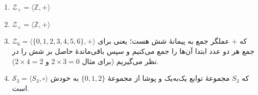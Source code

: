 \begin{enumerate}[\label=(\alph)]
    \item $\mathcal{Z_+}=\langle\mathbb{Z},+\rangle$
    \item $\mathcal{Z_\times}=\langle\mathbb{Z},+\rangle$
    \item $\mathcal{Z_6}=\langle\{0,1,2,3,4,5,6\},+\rangle$
    که $+$ عملگر جمع به پیمانهٔ شش هست؛ یعنی برای جمع هر دو عدد ابتدا آن‌ها را جمع می‌کنیم و سپس باقی‌ماندهٔ حاصل بر شش را در نظر می‌گیریم
    (برای مثال
    $2\times 3=0$
    و
    $2\times 4=2$).
    \item $\mathcal{S_3}=\langle S_3, \circ\rangle$
    که
    $S_3$
    مجموعهٔ توابع یک‌به‌یک و پوشا از مجموعهٔ
    $\{0,1,2\}$
    به خودش است.
\end{enumerate}